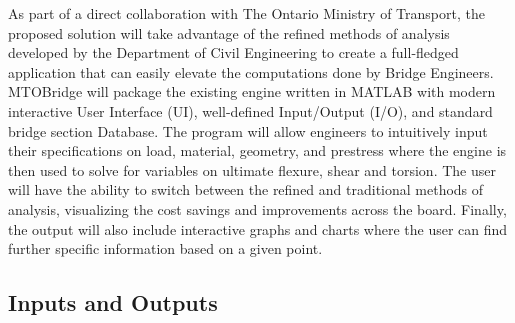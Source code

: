 \documentclass{article}
\begin{document}
As part of a direct collaboration with The Ontario Ministry of Transport, the proposed solution will take advantage of the refined methods of analysis developed by the Department of Civil Engineering to create a full-fledged application that can easily elevate the computations done by Bridge Engineers. MTOBridge will package the existing engine written in MATLAB with modern interactive User Interface (UI), well-defined Input/Output (I/O), and standard bridge section Database. The program will allow engineers to intuitively input their specifications on load, material, geometry, and prestress where the engine is then used to solve for variables on ultimate flexure, shear and torsion. The user will have the ability to switch between the refined and traditional methods of analysis, visualizing the cost savings and improvements across the board. Finally, the output will also include interactive graphs and charts where the user can find further specific information based on a given point. 


\subsection{Inputs and Outputs}



\end{document}
